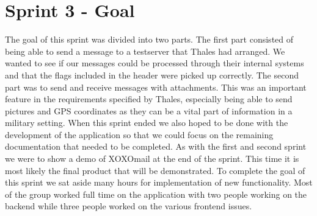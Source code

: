 \section{Sprint 3 - Goal}
The goal of this sprint was divided into two parts. The first part consisted of being able to send a message to a testserver that Thales had arranged. We wanted to see if our messages could be processed through their internal systems and that the flags included in the header were picked up correctly. The second part was to send and receive messages with attachments. This was an important feature in the requirements specified by Thales, especially being able to send pictures and GPS coordinates as they can be a vital part of information in a military setting.
\newline
\newline
When this sprint ended we also hoped to be done with the development of the application so that we could focus on the remaining documentation that needed to be completed. As with the first and second sprint we were to show a demo of XOXOmail at the end of the sprint. This time it is most likely the final product that will be demonstrated.
\newline
\newline
To complete the goal of this sprint we sat aside many hours for implementation of new functionality. Most of the group worked full time on the application with two people working on the backend while three people worked on the various frontend issues.